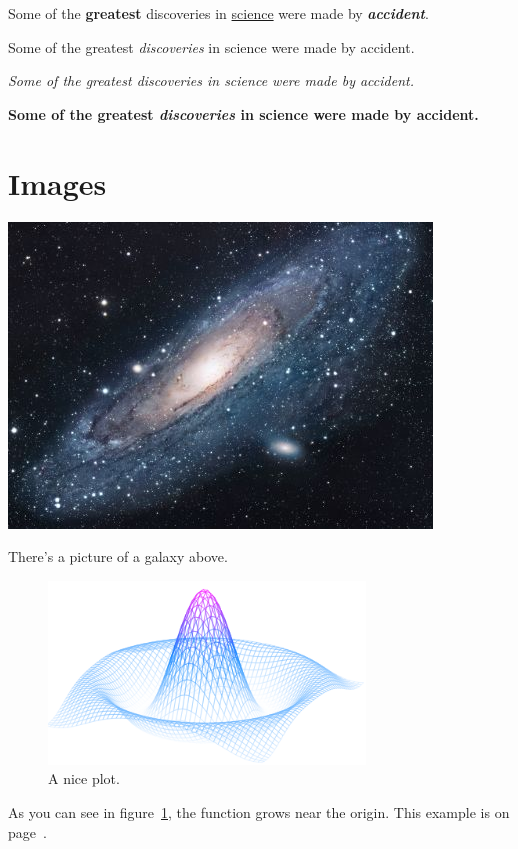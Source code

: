 \documentclass[12pt, letterpaper]{article}
\begin{document}
    Some of the \textbf{greatest} discoveries in \underline{science} were made by \textbf{\textit{accident}}.

    Some of the greatest \emph{discoveries} in science were made by accident.

    \textit{Some of the greatest \emph{discoveries} in science were made by accident.}

    \textbf{Some of the greatest \emph{discoveries} in science were made by accident.}


    \section{Images}\label{sec:images}

    \includegraphics{universe}

    There's a picture of a galaxy above.

    \begin{figure}[h]
        \centering
        \includegraphics[width=0.75\textwidth]{mesh}
        \caption{A nice plot.}
        \label{fig:mesh1}
    \end{figure}

    As you can see in figure~\ref{fig:mesh1}, the function grows near the origin.
    This example is on page~\pageref{fig:mesh1}.
\end{document}
